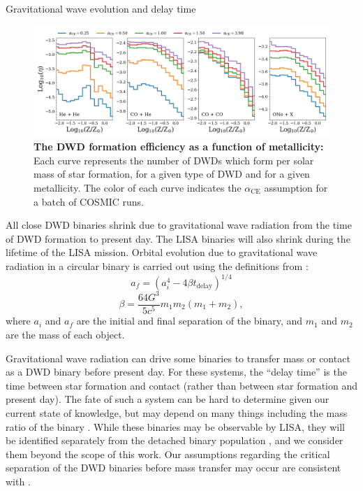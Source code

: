 \documentclass[twocolumn]{aastex631}
\newcommand*{\alphaCE}{\alpha_{\mathrm{CE}}}
\begin{document}
\begin{subsection}{Gravitational wave evolution and delay time}
\begin{figure}
\centering
\includegraphics[width=\textwidth]{CEb60_m12i_form_eff.png}
\caption{\label{fig:form_eff}
    \textbf{The DWD formation efficiency as a function of metallicity:}
    Each curve represents the number of DWDs which form per solar mass of star formation,
        for a given type of DWD and for a given metallicity.
    The color of each curve indicates the $\alphaCE$ assumption
        for a batch of COSMIC runs.
}
\end{figure}
All close DWD binaries shrink due to gravitational wave
    radiation from the time of DWD formation to present day.
The LISA binaries will also shrink during the lifetime of the LISA mission.
Orbital evolution due to gravitational wave radiation
    in a circular binary
    is carried out using the definitions from
    \citet{Peters1964}:
\begin{equation}\label{eq:gwsep}
    a_f = (a_i^4 - 4 \beta t_{\mathrm{delay}})^{1/4}
\end{equation}
\begin{equation}\label{eq:gwtimescale}
    \beta = \frac{64G^3}{5c^5} m_1m_2(m_1 + m_2),
\end{equation}
where $a_i$ and $a_f$ are the initial and final separation
    of the binary, and $m_1$ and $m_2$ are the mass of each object.

Gravitational wave radiation can drive some binaries to transfer mass
    or contact
    as a DWD binary before present day.
For these systems, the ``delay time'' is the time between
    star formation and contact
    (rather than between star formation and present day).
The fate of such a system can be hard to determine given our current state
    of knowledge, but may depend on many things including the mass ratio
    of the binary \citep{Marsh2004,Gokhale2007,Sepinsky2010,Kremer2015,Kremer2017}.
While these binaries may be observable by LISA,
    they will be identified separately from the detached binary population
    \citep{Breivik2018WD},
    and we consider them beyond the scope of this work.
Our assumptions regarding the critical separation of the DWD binaries
    before mass transfer may occur are consistent with \citet{Thiele2023}.


\end{subsection}
\end{document}
